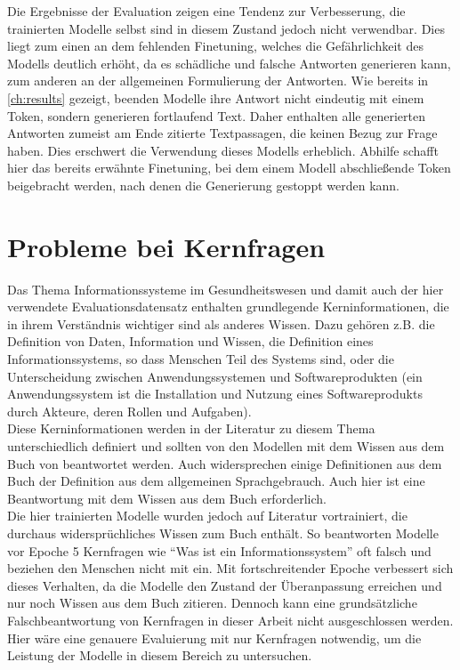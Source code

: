 Die Ergebnisse der Evaluation zeigen eine Tendenz zur Verbesserung, die trainierten Modelle selbst sind in diesem Zustand jedoch nicht verwendbar.
Dies liegt zum einen an dem fehlenden Finetuning, welches die Gefährlichkeit des Modells deutlich erhöht, da es schädliche und falsche Antworten generieren kann, zum anderen an der allgemeinen Formulierung der Antworten.
Wie bereits in \cref{ch:results} gezeigt, beenden Modelle ihre Antwort nicht eindeutig mit einem Token, sondern generieren fortlaufend Text.
Daher enthalten alle generierten Antworten zumeist am Ende zitierte Textpassagen, die keinen Bezug zur Frage haben.
Dies erschwert die Verwendung dieses Modells erheblich.
Abhilfe schafft hier das bereits erwähnte Finetuning, bei dem einem Modell abschließende Token beigebracht werden, nach denen die Generierung gestoppt werden kann.

\section{Probleme bei Kernfragen}
Das Thema Informationssysteme im Gesundheitswesen und damit auch der hier verwendete Evaluationsdatensatz enthalten grundlegende Kerninformationen,
die in ihrem Verständnis wichtiger sind als anderes Wissen. Dazu gehören z.B. die Definition von Daten, Information und Wissen, die Definition eines Informationssystems, so dass Menschen Teil des Systems sind, oder die Unterscheidung zwischen Anwendungssystemen und Softwareprodukten (ein Anwendungssystem ist die Installation und Nutzung eines Softwareprodukts durch Akteure, deren Rollen und Aufgaben).\\

Diese Kerninformationen werden in der Literatur zu diesem Thema unterschiedlich definiert und sollten von den Modellen mit dem Wissen aus dem Buch von \citet{bb} beantwortet werden.
Auch widersprechen einige Definitionen aus dem Buch der Definition aus dem allgemeinen Sprachgebrauch. Auch hier ist eine Beantwortung mit dem Wissen aus dem Buch erforderlich.\\

Die hier trainierten Modelle wurden jedoch auf Literatur vortrainiert, die durchaus widersprüchliches Wissen zum Buch enthält.
So beantworten Modelle vor Epoche 5 Kernfragen wie \enquote{Was ist ein Informationssystem} oft falsch und beziehen den Menschen nicht mit ein.
Mit fortschreitender Epoche verbessert sich dieses Verhalten, da die Modelle den Zustand der Überanpassung erreichen und nur noch Wissen aus dem Buch zitieren.
Dennoch kann eine grundsätzliche Falschbeantwortung von Kernfragen in dieser Arbeit nicht ausgeschlossen werden.
Hier wäre eine genauere Evaluierung mit nur Kernfragen notwendig, um die Leistung der Modelle in diesem Bereich zu untersuchen.\\

